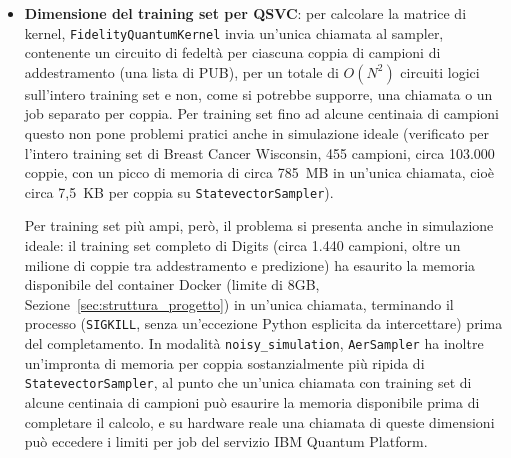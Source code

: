 \begin{itemize}
    \item \textbf{Dimensione del training set per QSVC}: per calcolare la matrice di kernel, \texttt{FidelityQuantumKernel} invia un'unica chiamata al sampler, contenente un circuito di fedeltà per ciascuna coppia di campioni di addestramento (una lista di PUB), per un totale di $O(N^2)$ circuiti logici sull'intero training set e non, come si potrebbe supporre, una chiamata o un job separato per coppia. Per training set fino ad alcune centinaia di campioni questo non pone problemi pratici anche in simulazione ideale (verificato per l'intero training set di Breast Cancer Wisconsin, 455 campioni, circa 103.000 coppie, con un picco di memoria di circa 785~MB in un'unica chiamata, cioè circa 7,5~KB per coppia su \texttt{StatevectorSampler}).

    Per training set più ampi, però, il problema si presenta anche in simulazione ideale: il training set completo di Digits (circa 1.440 campioni, oltre un milione di coppie tra addestramento e predizione) ha esaurito la memoria disponibile del container Docker (limite di 8GB, Sezione~\ref{sec:struttura_progetto}) in un'unica chiamata, terminando il processo (\texttt{SIGKILL}, senza un'eccezione Python esplicita da intercettare) prima del completamento. In modalità \texttt{noisy\_simulation}, \texttt{AerSampler} ha inoltre un'impronta di memoria per coppia sostanzialmente più ripida di \texttt{StatevectorSampler}, al punto che un'unica chiamata con training set di alcune centinaia di campioni può esaurire la memoria disponibile prima di completare il calcolo, e su hardware reale una chiamata di queste dimensioni può eccedere i limiti per job del servizio IBM Quantum Platform.


\end{itemize}
